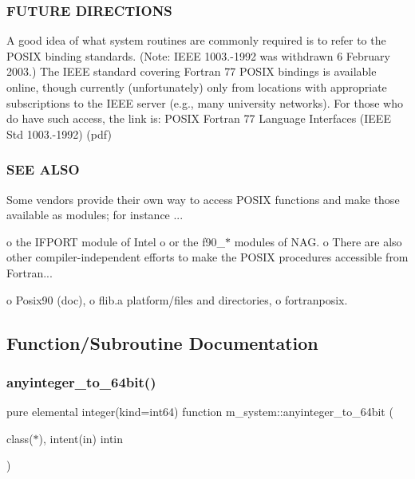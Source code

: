 \subsubsection*{F\+U\+T\+U\+RE D\+I\+R\+E\+C\+T\+I\+O\+NS}

A good idea of what system routines are commonly required is to refer to the P\+O\+S\+IX binding standards. (Note\+: I\+E\+EE 1003.-\/1992 was withdrawn 6 February 2003.) The I\+E\+EE standard covering Fortran 77 P\+O\+S\+IX bindings is available online, though currently (unfortunately) only from locations with appropriate subscriptions to the I\+E\+EE server (e.\+g., many university networks). For those who do have such access, the link is\+: P\+O\+S\+IX Fortran 77 Language Interfaces (I\+E\+EE Std 1003.-\/1992) (pdf)

\subsubsection*{S\+EE A\+L\+SO}

Some vendors provide their own way to access P\+O\+S\+IX functions and make those available as modules; for instance ...

o the I\+F\+P\+O\+RT module of Intel o or the f90\+\_\+$\ast$ modules of N\+AG. o There are also other compiler-\/independent efforts to make the P\+O\+S\+IX procedures accessible from Fortran...

o Posix90 (doc), o flib.\+a platform/files and directories, o fortranposix. 

\subsection{Function/\+Subroutine Documentation}
\mbox{\label{namespacem__system_a151da54be39dddcf270cceeff3243438}} 
\subsubsection{\texorpdfstring{anyinteger\+\_\+to\+\_\+64bit()}{anyinteger\_to\_64bit()}}
{\footnotesize\ttfamily pure elemental integer(kind=int64) function m\+\_\+system\+::anyinteger\+\_\+to\+\_\+64bit (\begin{DoxyParamCaption}\item[{class($\ast$), intent(in)}]{intin }\end{DoxyParamCaption})\hspace{0.3cm}{\ttfamily [private]}}



